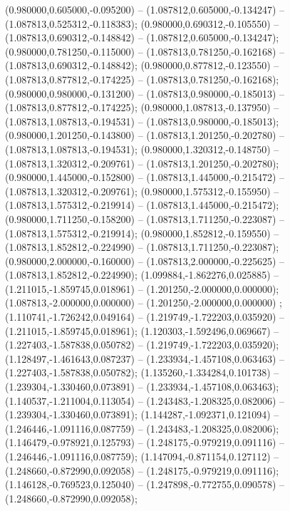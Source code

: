  (0.980000,0.605000,-0.095200) -- (1.087812,0.605000,-0.134247) -- (1.087813,0.525312,-0.118383);
 (0.980000,0.690312,-0.105550) -- (1.087813,0.690312,-0.148842) -- (1.087812,0.605000,-0.134247);
 (0.980000,0.781250,-0.115000) -- (1.087813,0.781250,-0.162168) -- (1.087813,0.690312,-0.148842);
 (0.980000,0.877812,-0.123550) -- (1.087813,0.877812,-0.174225) -- (1.087813,0.781250,-0.162168);
 (0.980000,0.980000,-0.131200) -- (1.087813,0.980000,-0.185013) -- (1.087813,0.877812,-0.174225);
 (0.980000,1.087813,-0.137950) -- (1.087813,1.087813,-0.194531) -- (1.087813,0.980000,-0.185013);
 (0.980000,1.201250,-0.143800) -- (1.087813,1.201250,-0.202780) -- (1.087813,1.087813,-0.194531);
 (0.980000,1.320312,-0.148750) -- (1.087813,1.320312,-0.209761) -- (1.087813,1.201250,-0.202780);
 (0.980000,1.445000,-0.152800) -- (1.087813,1.445000,-0.215472) -- (1.087813,1.320312,-0.209761);
 (0.980000,1.575312,-0.155950) -- (1.087813,1.575312,-0.219914) -- (1.087813,1.445000,-0.215472);
 (0.980000,1.711250,-0.158200) -- (1.087813,1.711250,-0.223087) -- (1.087813,1.575312,-0.219914);
 (0.980000,1.852812,-0.159550) -- (1.087813,1.852812,-0.224990) -- (1.087813,1.711250,-0.223087);
 (0.980000,2.000000,-0.160000) -- (1.087813,2.000000,-0.225625) -- (1.087813,1.852812,-0.224990);
 (1.099884,-1.862276,0.025885) -- (1.211015,-1.859745,0.018961) -- (1.201250,-2.000000,0.000000);
 (1.087813,-2.000000,0.000000) -- (1.201250,-2.000000,0.000000) ;
 (1.110741,-1.726242,0.049164) -- (1.219749,-1.722203,0.035920) -- (1.211015,-1.859745,0.018961);
 (1.120303,-1.592496,0.069667) -- (1.227403,-1.587838,0.050782) -- (1.219749,-1.722203,0.035920);
 (1.128497,-1.461643,0.087237) -- (1.233934,-1.457108,0.063463) -- (1.227403,-1.587838,0.050782);
 (1.135260,-1.334284,0.101738) -- (1.239304,-1.330460,0.073891) -- (1.233934,-1.457108,0.063463);
 (1.140537,-1.211004,0.113054) -- (1.243483,-1.208325,0.082006) -- (1.239304,-1.330460,0.073891);
 (1.144287,-1.092371,0.121094) -- (1.246446,-1.091116,0.087759) -- (1.243483,-1.208325,0.082006);
 (1.146479,-0.978921,0.125793) -- (1.248175,-0.979219,0.091116) -- (1.246446,-1.091116,0.087759);
 (1.147094,-0.871154,0.127112) -- (1.248660,-0.872990,0.092058) -- (1.248175,-0.979219,0.091116);
 (1.146128,-0.769523,0.125040) -- (1.247898,-0.772755,0.090578) -- (1.248660,-0.872990,0.092058);
